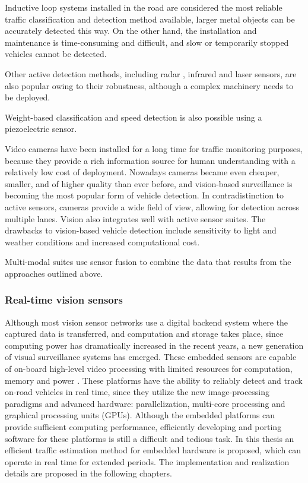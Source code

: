 Inductive loop systems installed in the road are considered the most reliable traffic classification and detection method available, larger metal objects can be accurately detected this way. 
On the other hand, the installation and maintenance is time-consuming and difficult, and slow or temporarily stopped vehicles cannot be detected\cite{Diamond, Zhang2016}.

Other active detection methods, including radar \cite{DeepBlue}, infrared\cite{Swarco, Hussain1995, Ghazal2016} and laser\cite{SICK, Gallego2009} sensors, are also popular owing to their robustness, although a complex machinery needs to be deployed.

Weight-based classification and speed detection is also possible using a piezoelectric sensor\cite{Te, Rivas2017}.

Video cameras have been installed for a long time for traffic monitoring purposes, because they provide a rich information source for human understanding with a relatively low cost of deployment\cite{Tian2011, Buch2011, VideoSurveillance, LaSemaforica}.
Nowadays cameras became even cheaper, smaller, and of higher quality than ever before, and vision-based surveillance is becoming the most popular form of vehicle detection.
In contradistinction to active sensors, cameras provide a wide field of view, allowing for detection across multiple lanes. 
Vision also integrates well with active sensor suites.
The drawbacks to vision-based vehicle detection include sensitivity to light and weather conditions and increased computational cost\cite{Shivaraman2013}.

Multi-modal suites use sensor fusion to combine the data that results from the approaches outlined above\cite{Swarco}.

\subsubsection{Real-time vision sensors}
Although most vision sensor networks use a digital backend system where the captured data is transferred, and computation and storage takes place, since computing power has dramatically increased in the recent years, a new generation of visual surveillance systems has emerged.
These embedded sensors are capable of on-board high-level video processing with limited resources for computation, memory and power \cite{Bramberger2004}.
These platforms have the ability to reliably detect and track on-road vehicles in real time, since they utilize the new image-processing paradigms and advanced hardware: parallelization, multi-core processing and graphical processing units (GPUs)\cite{Sivaraman2013}.
Although the embedded platforms can provide sufficient computing performance, efficiently developing and porting software for these platforms is still a difficult and tedious task\cite{Bramberger2004}.
In this thesis an efficient traffic estimation method for embedded hardware is proposed, which can operate in real time for extended periods.
The implementation and realization details are proposed in the following chapters.

